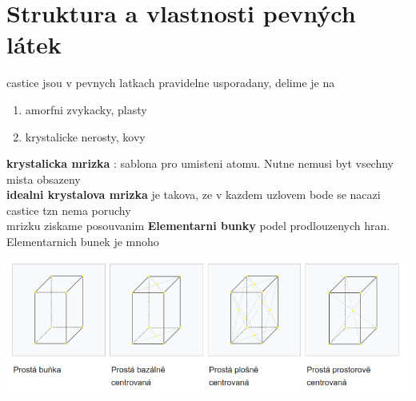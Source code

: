 \documentclass{report}
\begin{document}
\section{Struktura a vlastnosti pevných látek}
castice jsou v pevnych latkach pravidelne usporadany, delime je na 
\begin{enumerate}[label=\bfseries\tiny\protect\circled{\small\arabic*}]
  \item amorfni zvykacky, plasty
  \item krystalicke nerosty, kovy
\end{enumerate}
\textbf{krystalicka mrizka} : sablona pro umisteni atomu. Nutne nemusi byt vsechny mista obsazeny\\
\textbf{idealni krystalova mrizka} je takova, ze v kazdem uzlovem bode se nacazi castice tzn nema poruchy \\
mrizku ziskame posouvanim \textbf{Elementarni bunky} podel prodlouzenych hran. Elementarnich bunek je mnoho \\

\begin{center}
  \includegraphics[width=\linewidth]{images/bunky.png}
\end{center}
\end{document}
